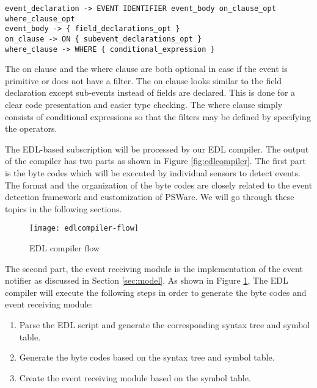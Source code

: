 \begin{lstlisting}[caption=BNF (simplified) of event type, label=lst:BNFEvent]
event_declaration -> EVENT IDENTIFIER event_body on_clause_opt where_clause_opt
event_body -> { field_declarations_opt }
on_clause -> ON { subevent_declarations_opt }
where_clause -> WHERE { conditional_expression }
\end{lstlisting}

The on clause and the where clause are both optional in case if the event is primitive or does not have a filter. The on clause looks similar to the field declaration except sub-events instead of fields are declared. This is done for a clear code presentation and easier type checking. The where clause simply consists of conditional expressions so that the filters may be defined by specifying the operators.

\begin{comment}
A simple example of using EDL is shown in Listing \ref{lst:originaledl}. In this example, two events, 'SimpleEvent' and 'CompEvent' are defined. 'SimpleEvent' is a primitive event which occurs when the detected temperature reading is above certain threshold. 'CompEvent' is a composite event that is based on two events of 'SimpleEvent' and their time must satisfy a certain condition in order to indicate the occurrence of 'CompEvent'.
\begin{lstlisting}[caption=A simple EDL program, label=lst:originaledl]
Event SimpleEvent {
	int temp=System.temp;
	int id=System.id;
	int time=System.time;
} where {
	temp > 30
}
Event CompEvent {
} on {
	SimpleEvent e1 and
	SimpleEvent e2
} where {
	e2.time-e1.time=600
}
\end{lstlisting}
\end{comment}

The EDL-based subscription will be processed by our EDL compiler. The output of the compiler has two parts as shown in Figure \ref{fig:edlcompiler}. The first part is the byte codes which will be executed by individual sensors to detect events. The format and the organization of the byte codes are closely related to the event detection framework and customization of PSWare. We will go through these topics in the following sections.

\begin{figure}
\centering
\texttt{[image: edlcompiler-flow]}
\caption{EDL compiler flow}
\label{fig:edlcompiler-flow}
\end{figure}

The second part, the event receiving module is the implementation of the event notifier as discussed in Section \ref{sec:model}. As shown in Figure \ref{fig:edlcompiler-flow}, The EDL compiler will execute the following steps in order to generate the byte codes and event receiving module:
\begin{enumerate}
\item Parse the EDL script and generate the corresponding syntax tree and symbol table.
\item Generate the byte codes based on the syntax tree and symbol table.
\item Create the event receiving module based on the symbol table.
\end{enumerate}


